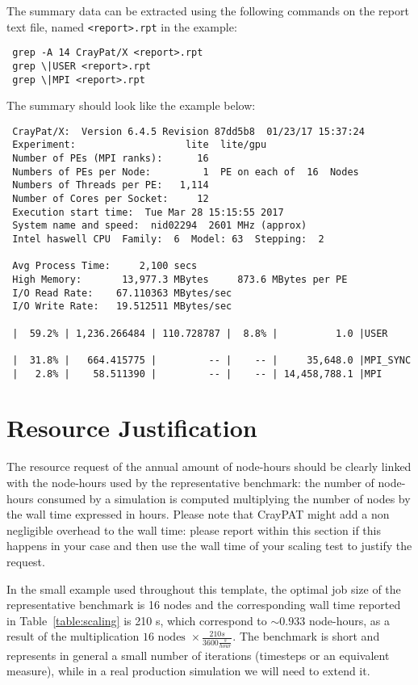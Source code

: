 \documentclass[11pt]{article}
\begin{document}
The summary data can be extracted using the following commands on the report text file, named \verb!<report>.rpt! in the example:
\begin{verbatim}
 grep -A 14 CrayPat/X <report>.rpt
 grep \|USER <report>.rpt
 grep \|MPI <report>.rpt
\end{verbatim}

The summary should look like the example below: 
\begin{verbatim}
 CrayPat/X:  Version 6.4.5 Revision 87dd5b8  01/23/17 15:37:24
 Experiment:                   lite  lite/gpu     
 Number of PEs (MPI ranks):      16
 Numbers of PEs per Node:         1  PE on each of  16  Nodes
 Numbers of Threads per PE:   1,114
 Number of Cores per Socket:     12
 Execution start time:  Tue Mar 28 15:15:55 2017
 System name and speed:  nid02294  2601 MHz (approx)
 Intel haswell CPU  Family:  6  Model: 63  Stepping:  2
 
 Avg Process Time:     2,100 secs             
 High Memory:       13,977.3 MBytes     873.6 MBytes per PE
 I/O Read Rate:    67.110363 MBytes/sec       
 I/O Write Rate:   19.512511 MBytes/sec
 
 |  59.2% | 1,236.266484 | 110.728787 |  8.8% |          1.0 |USER
 
 |  31.8% |   664.415775 |         -- |    -- |     35,648.0 |MPI_SYNC
 |   2.8% |    58.511390 |         -- |    -- | 14,458,788.1 |MPI
\end{verbatim}

\section{Resource Justification}
The resource request of the annual amount of node-hours should be clearly linked with the node-hours used 
by the representative benchmark: the number of node-hours consumed by a simulation is computed multiplying 
the number of nodes by the wall time expressed in hours. 
Please note that CrayPAT might add a non negligible overhead to the wall time: please report within this section 
if this happens in your case and then use the wall time of your scaling test to justify the request.

In the small example used throughout this template, the optimal job size of the representative benchmark is 16 nodes and 
the corresponding wall time reported in Table~\ref{table:scaling} is 210 s, which correspond to $\sim 0.933$ node-hours, 
as a result of the multiplication $16 \mbox { nodes } \times \frac{210 s}{3600 \frac{s}{hour}}$. 
The benchmark is short and represents in general a small number of iterations (timesteps or an equivalent measure), while in a real production simulation we will need to extend it.
\end{document}
